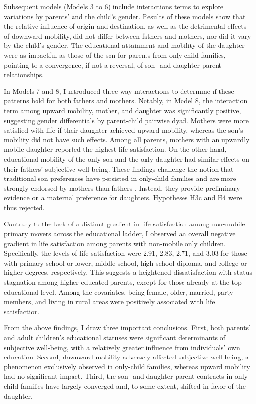Subsequent models (Models 3 to 6) include interactions terms to explore variations by parents' and the child's gender. Results of these models show that the relative influence of origin and destination, as well as the detrimental effects of downward mobility, did not differ between fathers and mothers, nor did it vary by the child's gender. The educational attainment and mobility of the daughter were as impactful as those of the son for parents from only-child families, pointing to a convergence, if not a reversal, of son- and daughter-parent relationships.

In Models 7 and 8, I introduced three-way interactions to determine if these patterns hold for both fathers and mothers. Notably, in Model 8, the interaction term among upward mobility, mother, and daughter was significantly positive, suggesting gender differentials by parent-child pairwise dyad. Mothers were more satisfied with life if their daughter achieved upward mobility, whereas the son's mobility did not have such effects. Among all parents, mothers with an upwardly mobile daughter reported the highest life satisfaction. On the other hand, educational mobility of the only son and the only daughter had similar effects on their fathers’ subjective well-being. These findings challenge the notion that traditional son preferences have persisted in only-child families and are more strongly endorsed by mothers than fathers \parencite{liuBoysOnlychildrenGirls2006,sunAreMothersSons2017}. Instead, they provide preliminary evidence on a maternal preference for daughters. Hypotheses H3c and H4 were thus rejected.

Contrary to the lack of a distinct gradient in life satisfaction among non-mobile primary movers across the educational ladder, I observed an overall negative gradient in life satisfaction among parents with non-mobile only children. Specifically, the levels of life satisfaction were 2.91, 2.83, 2.71, and 3.03 for those with primary school or lower, middle school, high-school diploma, and college or higher degrees, respectively. This suggests a heightened dissatisfaction with status stagnation among higher-educated parents, except for those already at the top educational level. Among the covariates, being female, older, married, party members, and living in rural areas were positively associated with life satisfaction.

From the above findings, I draw three important conclusions. First, both parents' and adult children's educational statuses were significant determinants of subjective well-being, with a relatively greater influence from individuals' own education. Second, downward mobility adversely affected subjective well-being, a phenomenon exclusively observed in only-child families, whereas upward mobility had no significant impact. Third, the son- and daughter-parent contracts in only-child families have largely converged and, to some extent, shifted in favor of the daughter.
